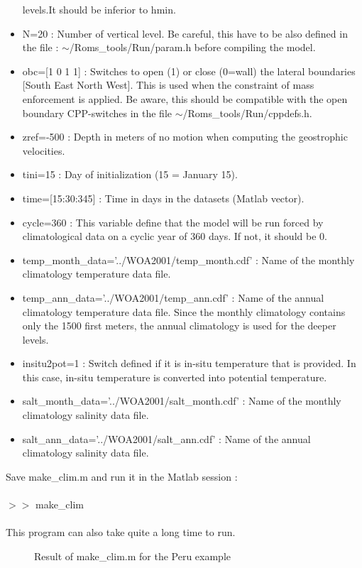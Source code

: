\begin{itemize}
levels.It should be inferior to hmin.
\item N=20 : Number of vertical level. Be careful, this have to be also 
defined in the file : $\sim$/Roms\_tools/Run/param.h before compiling
the model.
\item obc=[1 0 1 1] : Switches to open (1) or close (0=wall) the lateral
boundaries [South East North West]. This is used when the constraint of mass
enforcement is applied. Be aware, this should be compatible with the open boundary
CPP-switches in the file $\sim$/Roms\_tools/Run/cppdefs.h.
\item zref=-500 : Depth in meters of no motion when computing the geostrophic 
velocities.
\item tini=15 : Day of initialization (15 = January 15).
\item time=[15:30:345] : Time in days in the datasets (Matlab vector).
\item cycle=360 : This variable define that the model will be run 
forced by climatological data on a cyclic year of 360 days.
If not, it should be 0.
\item temp\_month\_data='../WOA2001/temp\_month.cdf' : Name of the monthly
climatology temperature data file.
\item temp\_ann\_data='../WOA2001/temp\_ann.cdf' : Name of the annual
climatology temperature data file. Since the monthly climatology 
contains only the 1500 first meters, the annual climatology is used for the 
deeper levels.
\item insitu2pot=1 : Switch defined if it is in-situ temperature that is provided.
In this case, in-situ temperature is converted into potential temperature.
\item salt\_month\_data='../WOA2001/salt\_month.cdf' : Name of the monthly
climatology salinity data file.
\item salt\_ann\_data='../WOA2001/salt\_ann.cdf' : Name of the annual
climatology salinity data file.
\end{itemize}

Save make\_clim.m and run it in the Matlab session :
\\ \\
$>>$ make\_clim 
\\ \\
This program can also take quite a long time to run.

\begin{figure}[h!]
\centerline{}
\caption{Result of make\_clim.m for the Peru example}
\label{fig:clim}
\end{figure}


